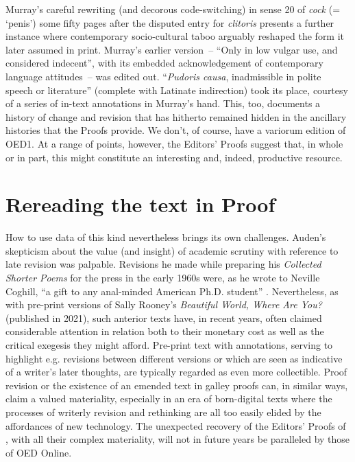 \documentclass[output=paper,colorlinks,citecolor=brown,arabicfont,chinesefont]{langscibook}
\begin{document}
Murray’s careful rewriting (and decorous code-switching) in sense 20 of \emph{cock} (= ‘penis’) some fifty pages after the disputed entry for \emph{clitoris} presents a further instance where contemporary socio-cultural taboo arguably reshaped the form it later assumed in print. Murray’s earlier version~-- “Only in low vulgar use, and considered indecent”, with its embedded acknowledgement of contemporary language attitudes~-- was edited out. “\emph{Pudoris causa}, inadmissible in polite speech or literature” (complete with Latinate indirection) took its place, courtesy of a series of in-text annotations in Murray’s hand. This, too, documents a history of change and revision that has hitherto remained hidden in the ancillary histories that the Proofs provide. We don’t, of course, have a variorum edition of OED1. At a range of points, however, the Editors’ Proofs suggest that, in whole or in part, this might constitute an interesting and, indeed, productive resource.

\section{Rereading the text in Proof}

How to use data of this kind nevertheless brings its own challenges. Auden’s skepticism about the value (and insight) of academic scrutiny with reference to late revision was palpable.  Revisions he made while preparing his \emph{Collected Shorter Poems} for the press in the early 1960s were, as he wrote to Neville Coghill, “a gift to any anal-minded American Ph.D. student” \citep{Crook1990}. Nevertheless, as with pre-print versions of Sally Rooney’s \emph{Beautiful World, Where Are You?} (published in 2021), such anterior texts have, in recent years, often claimed considerable attention in relation both to their monetary cost \citep{Strzyzynska2021} as well as the critical exegesis they might afford. Pre-print text with annotations, serving to highlight e.g. revisions between different versions or which are seen as indicative of a writer’s later thoughts, are typically regarded as even more collectible. Proof revision or the existence of an emended text in galley proofs can, in similar ways, claim a valued materiality, especially in an era of born-digital texts where the processes of writerly revision and rethinking are all too easily elided by the affordances of new technology. The unexpected recovery of the Editors’ Proofs of \citet{Murrayetal1884}, with all their complex materiality, will not in future years be paralleled by those of OED Online. 
\end{document}
